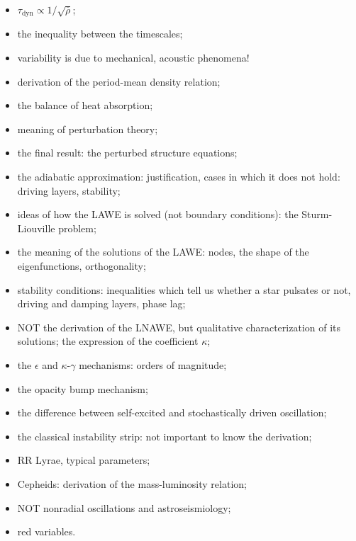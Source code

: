 \documentclass[main.tex]{subfiles}
\begin{document}
\begin{itemize}
    \item \(\tau _{\text{dyn}} \propto 1/\sqrt{\overline{\rho } } \);
    \item the inequality between the timescales;
    \item variability is due to mechanical, acoustic phenomena!
    \item derivation of the period-mean density relation;
    \item the balance of heat absorption;
    \item meaning of perturbation theory;
    \item the final result: the perturbed structure equations;
    \item the adiabatic approximation: justification, cases in which it does not hold: driving layers, stability;
    \item ideas of how the LAWE is solved (not boundary conditions): the Sturm-Liouville problem;
    \item the meaning of the solutions of the LAWE: nodes, the shape of the eigenfunctions, orthogonality;
    \item stability conditions: inequalities which tell us whether a star pulsates or not, driving and damping layers, phase lag;
    \item NOT the derivation of the LNAWE, but qualitative characterization of its solutions; the expression of the coefficient \(\kappa \);
    \item the \(\epsilon \) and \(\kappa \)-\(\gamma \) mechanisms: orders of magnitude;
    \item the opacity bump mechanism;
    \item the difference between self-excited and stochastically driven oscillation;
    \item the classical instability strip: not important to know the derivation;
    \item RR Lyrae, typical parameters;
    \item Cepheids: derivation of the mass-luminosity relation;
    \item NOT nonradial oscillations and astroseismiology;
    \item red variables.
\end{itemize}
\end{document}
